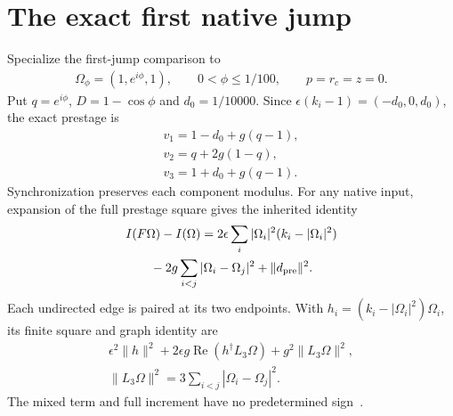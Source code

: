 \section{The exact first native jump}\label{sec:firstjump}
Specialize the first-jump comparison to
\begin{equation}\label{eq:a23}%
\begin{gathered}
\Omega_\phi=(1,e^{i\phi},1),\qquad 0<\phi\le1/100,\qquad p=r_c=z=0.
\end{gathered}
\end{equation}
Put $q=e^{i\phi}$, $D=1-\cos\phi$ and $d_0=1/10000$. Since $\epsilon(k_i-1)=(-d_0,0,d_0)$, the exact prestage is
\begin{equation}\label{eq:a24}%
\begin{gathered}
v_1=1-d_0+g(q-1),\\ v_2=q+2g(1-q),\\ v_3=1+d_0+g(q-1).
\end{gathered}
\end{equation}
Synchronization preserves each component modulus. For any native input, expansion of the full prestage square gives the inherited identity
\begin{equation}\label{eq:a25}%
\begin{gathered}
I(F\Omega)-I(\Omega)=
2\epsilon\sum_i|\Omega_i|^2(k_i-|\Omega_i|^2)
\\ {}-2g\sum_{i<j}|\Omega_i-\Omega_j|^2+\|d_{\rm pre}\|^2.
\end{gathered}
\end{equation}
Each undirected edge is paired at its two endpoints. With $h_i=(k_i-|\Omega_i|^2)\Omega_i$, its finite square and graph identity are
\begin{equation}\label{eq:a26}%
\begin{gathered}
\epsilon^2\|h\|^2+2\epsilon g\operatorname{Re}(h^\dagger L_3\Omega)
+g^2\|L_3\Omega\|^2,\\ \|L_3\Omega\|^2=3\sum_{i<j}|\Omega_i-\Omega_j|^2.
\end{gathered}
\end{equation}
The mixed term and full increment have no predetermined sign~\cite[Section 6, native intensity identity]{rx}.

